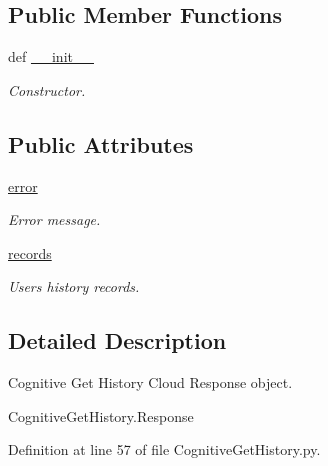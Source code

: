 \subsection*{Public Member Functions}
\begin{DoxyCompactItemize}
\item 
def \hyperlink{classRappCloud_1_1CloudMsgs_1_1CognitiveGetHistory_1_1CognitiveGetHistory_1_1Response_a180f70be5a0eed598190398fbe171ef1}{\-\_\-\-\_\-init\-\_\-\-\_\-}
\begin{DoxyCompactList}\small\item\em Constructor. \end{DoxyCompactList}\end{DoxyCompactItemize}
\subsection*{Public Attributes}
\begin{DoxyCompactItemize}
\item 
\hyperlink{classRappCloud_1_1CloudMsgs_1_1CognitiveGetHistory_1_1CognitiveGetHistory_1_1Response_ad86856095112982a4b4de67183d08cb1}{error}
\begin{DoxyCompactList}\small\item\em Error message. \end{DoxyCompactList}\item 
\hyperlink{classRappCloud_1_1CloudMsgs_1_1CognitiveGetHistory_1_1CognitiveGetHistory_1_1Response_a7cdbfcc90729b4af6dc637191b9e4490}{records}
\begin{DoxyCompactList}\small\item\em Users history records. \end{DoxyCompactList}\end{DoxyCompactItemize}


\subsection{Detailed Description}
\begin{DoxyVerb}Cognitive Get History Cloud Response object.

CognitiveGetHistory.Response
\end{DoxyVerb}
 

Definition at line 57 of file Cognitive\-Get\-History.\-py.



